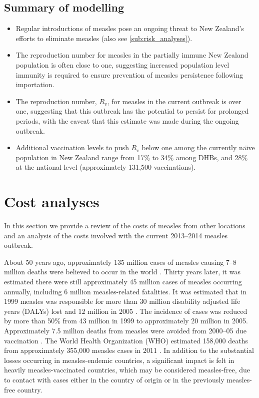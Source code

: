 \documentclass{article}
\begin{document}
\subsection{Summary of modelling}
\begin{itemize}
\item Regular introductions of measles pose an ongoing threat to New Zealand's efforts to eliminate measles (also see \autoref{sub:risk_analyses}).
\item The reproduction number for measles in the partially immune New Zealand population is often close to one, suggesting increased population level immunity is required to ensure prevention of measles persistence following importation.
 \item The reproduction number, $R_v$, for measles in the current outbreak is over one, suggesting that this outbreak has the potential to persist for prolonged periods, with the caveat that this estimate was made during the ongoing outbreak.
 \item Additional vaccination levels to push $R_v$ below one among the currently na\"{\i}ve population in New Zealand range from 17\% to 34\% among DHBs, and 28\% at the national level (approximately 131,500 vaccinations).
\end{itemize}

\section{Cost analyses}

In this section we provide a review of the costs of measles from other locations and an analysis of the costs involved with the current 2013--2014 measles outbreak.

About 50 years ago, approximately 135 million cases of measles causing 7--8 million deaths were believed to occur in the world \citep{clements4}. Thirty years later, it was estimated there were still approximately 45 million cases of measles occurring annually, including 6 million measles-related fatalities. It was estimated that in 1999 measles was responsible for more than 30 million disability adjusted life years (DALYs) lost and 12 million in 2005 \citep{wolfson7}. The incidence of cases was reduced by more than 50\% from 43 million in 1999 to approximately 20 million in 2005. Approximately 7.5 million deaths from measles were avoided from 2000--05 due vaccination \citep{wolfson7}. The World Health Organization (WHO) estimated 158,000 deaths from approximately 355,000 measles cases in 2011 \citep{who13}.  In addition to the substantial losses occurring in measles-endemic countries, a significant impact is felt in heavily measles-vaccinated countries, which may be considered measles-free, due to contact with cases either in the country of origin or in the previously measles-free country.
\end{document}
